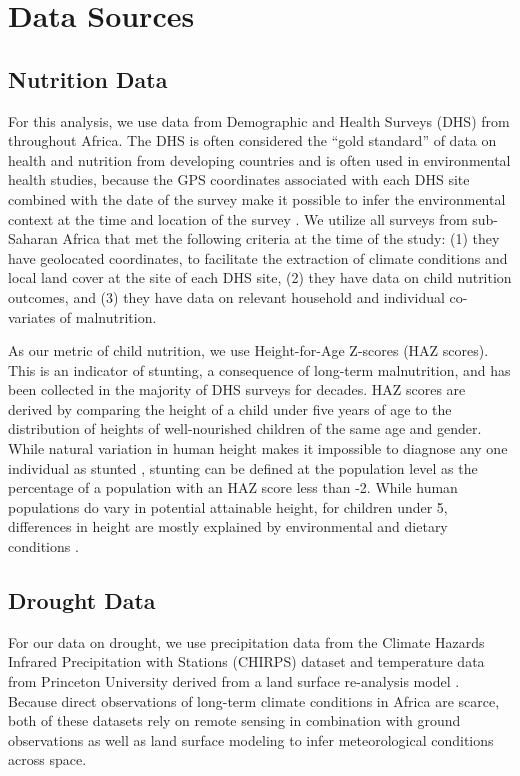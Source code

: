 \documentclass[titlepage]{article}
\begin{document}
\section{Data Sources}

\subsection{Nutrition Data}
For this analysis, we use data from Demographic and Health Surveys (DHS) from throughout Africa.  The DHS is often considered the ``gold standard'' of data on health and nutrition from developing countries and is often used in environmental health studies, because the GPS coordinates associated with each DHS site combined with the date of the survey make it possible to infer the environmental context at the time and location of the survey \citep{Brown2014, enenkel2020predict}.  We utilize all surveys from sub-Saharan Africa that met the following criteria at the time of the study: (1) they have geolocated coordinates, to facilitate the extraction of climate conditions and local land cover at the site of each DHS site, (2) they have data on child nutrition outcomes, and (3) they have data on relevant household and individual co-variates of malnutrition.

As our metric of child nutrition, we use Height-for-Age Z-scores (HAZ scores).  This is an indicator of stunting, a consequence of long-term malnutrition, and has been collected in the majority of DHS surveys for decades.  HAZ scores are derived by comparing the height of a child under five years of age to the distribution of heights of well-nourished children of the same age and gender.  While natural variation in human height makes it impossible to diagnose any one individual as stunted \citep{Perumal2018}, stunting can be defined at the population level as the percentage of a population with an HAZ score less than -2.  While human populations do vary in potential attainable height, for children under 5, differences in height are mostly explained by environmental and dietary conditions \citep{Habicht1974}.

\subsection{Drought Data}
For our data on drought, we use precipitation data from the Climate Hazards Infrared Precipitation with Stations (CHIRPS) dataset \citep{Funk2015} and temperature data from Princeton University derived from a land surface re-analysis model \citep{Sheffield2006}.  Because direct observations of long-term climate conditions in Africa are scarce, both of these datasets rely on remote sensing in combination with ground observations as well as land surface modeling to infer meteorological conditions across space.
\end{document}
